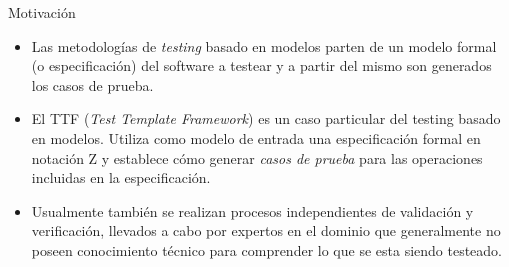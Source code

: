 \documentclass{beamer}
\begin{document}
\begin{frame}{Motivación}{}
  \begin{itemize}
            							
    \item {
        Las metodologías de \emph{testing} basado en modelos parten de un modelo formal (o especificación) del software a testear y a partir del mismo son generados los casos de prueba. 
      }
                  										
                  										
      \item {
          El TTF (\emph{Test Template Framework}) es un caso particular del testing basado en modelos. Utiliza como modelo de entrada una especificación formal en notación Z y establece cómo generar \emph{casos de prueba} para las operaciones incluidas en la especificación.
                             				  				  					      
        }
                        													
                        													
        \item {
            Usualmente también se realizan procesos independientes de validación y verificación, llevados a cabo por expertos en el dominio que generalmente no poseen conocimiento técnico para comprender lo que se esta siendo testeado.
          }
                              																
                              																
        \end{itemize}
      \end{frame}
                  										
\end{document}

